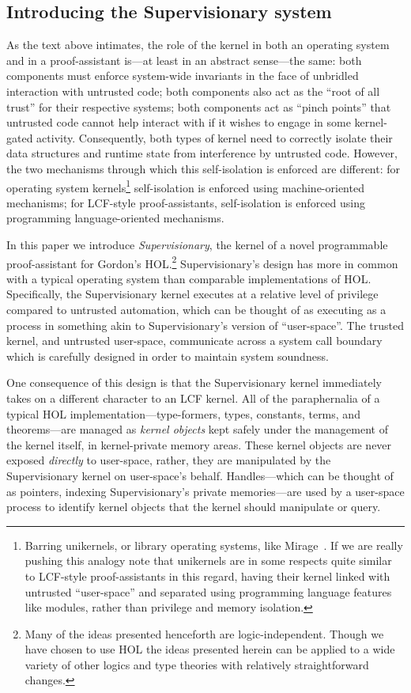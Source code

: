 \documentclass[a4paper, UKenglish, cleveref, autoref, thm-restate, colorlinks]{lipics-v2021}
\begin{document}
\subsection{Introducing the Supervisionary system}

As the text above intimates, the role of the kernel in both an operating system and in a proof-assistant is---at least in an abstract sense---the same: both components must enforce system-wide invariants in the face of unbridled interaction with untrusted code; both components also act as the ``root of all trust'' for their respective systems; both components act as ``pinch points'' that untrusted code cannot help interact with if it wishes to engage in some kernel-gated activity.
Consequently, both types of kernel need to correctly isolate their data structures and runtime state from interference by untrusted code.
However, the two mechanisms through which this self-isolation is enforced are different: for operating system kernels\footnote{Barring unikernels, or library operating systems, like Mirage~\cite{10.1145/2490301.2451167, 10.1145/2451116.2451167}.  If we are really pushing this analogy note that unikernels are in some respects quite similar to LCF-style proof-assistants in this regard, having their kernel linked with untrusted ``user-space'' and separated using programming language features like modules, rather than privilege and memory isolation.} self-isolation is enforced using machine-oriented mechanisms; for LCF-style proof-assistants, self-isolation is enforced using programming language-oriented mechanisms.

In this paper we introduce \emph{Supervisionary}, the kernel of a novel programmable proof-assistant for Gordon's HOL.\footnote{Many of the ideas presented henceforth are logic-independent.  Though we have chosen to use HOL the ideas presented herein can be applied to a wide variety of other logics and type theories with relatively straightforward changes.}
Supervisionary's design has more in common with a typical operating system than comparable implementations of HOL.
Specifically, the Supervisionary kernel executes at a relative level of privilege compared to untrusted automation, which can be thought of as executing as a process in something akin to Supervisionary's version of ``user-space''.
The trusted kernel, and untrusted user-space, communicate across a system call boundary which is carefully designed in order to maintain system soundness.

One consequence of this design is that the Supervisionary kernel immediately takes on a different character to an LCF kernel.
All of the paraphernalia of a typical HOL implementation---type-formers, types, constants, terms, and theorems---are managed as \emph{kernel objects} kept safely under the management of the kernel itself, in kernel-private memory areas.
These kernel objects are never exposed \emph{directly} to user-space, rather, they are manipulated by the Supervisionary kernel on user-space's behalf.
Handles---which can be thought of as pointers, indexing Supervisionary's private memories---are used by a user-space process to identify kernel objects that the kernel should manipulate or query.
\end{document}
